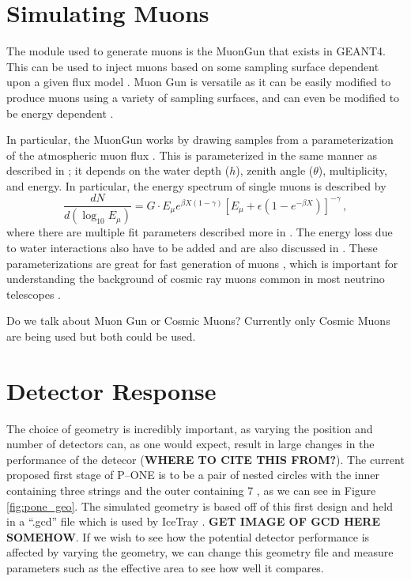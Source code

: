 \section{Simulating Muons}

The module used to generate muons is the MuonGun that exists in GEANT4. This can be used to inject muons based on some sampling surface dependent upon a given flux model \cite{icetray}. Muon Gun is versatile as it can be easily modified to produce muons using a variety of sampling surfaces, and can even be modified to be energy dependent \cite{icetray}.

In particular, the MuonGun works by drawing samples from a parameterization of the atmospheric muon flux \cite{icetray}. This is parameterized in the same manner as described in \cite{muon_flux}; it depends on the water depth ($h$), zenith angle ($\theta$), multiplicity, and energy. In particular, the energy spectrum of single muons is described by
\begin{equation}
  \frac{dN}{d(\log_{10}E_{\mu})} = G\cdot E_{\mu}e^{\beta X(1 - \gamma)}\left[E_{\mu} + \epsilon(1 - e^{-\beta X})\right]^{-\gamma}\, ,
\end{equation}
where there are multiple fit parameters described more in \cite{muon_flux}. The energy loss due to water interactions also have to be added and are also discussed in \cite{muon_flux}. These parameterizations are great for fast generation of muons \cite{muon_flux}, which is important for understanding the background of cosmic ray muons common in most neutrino telescopes \cite{icecube, antares, amanda, pone, muon_flux}. 

Do we talk about Muon Gun or Cosmic Muons? Currently only Cosmic Muons are being used but both could be used.

\section{Detector Response}

The choice of geometry is incredibly important, as varying the position and number of detectors can, as one would expect, result in large changes in the performance of the detecor (\textbf{WHERE TO CITE THIS FROM?}). The current proposed first stage of P--ONE is to be a pair of nested circles with the inner containing three strings and the outer containing 7 \cite{pone}, as we can see in Figure \ref{fig:pone_geo}. The simulated geometry is based off of this first design and held in a ``.gcd'' file which is used by IceTray \cite{icetray}. \textbf{GET IMAGE OF GCD HERE SOMEHOW}. If we wish to see how the potential detector performance is affected by varying the geometry, we can change this geometry file and measure parameters such as the effective area to see how well it compares.

